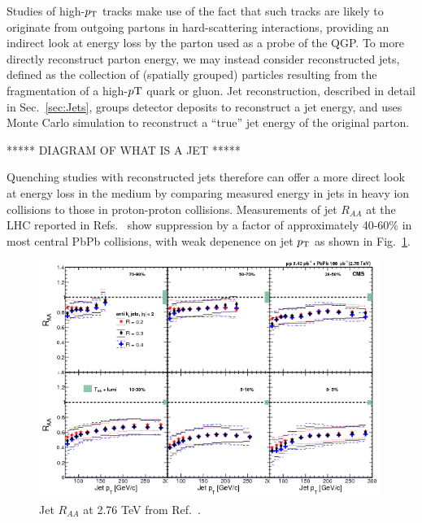Studies of high-$p_{\rm T}$ tracks make use of the fact that such tracks are likely to originate from outgoing partons in hard-scattering interactions, providing an indirect look at energy loss by the parton used as a probe of the QGP.  To more directly reconstruct parton energy, we may instead consider reconstructed jets, defined as the collection of (spatially grouped) particles resulting from the fragmentation of a high-$p{\rm T}$ quark or gluon.  Jet reconstruction, described in detail in Sec.~\ref{sec:Jets}, groups detector deposits to reconstruct a jet energy, and uses Monte Carlo simulation to reconstruct a ``true'' jet energy of the original parton. 

***** DIAGRAM OF WHAT IS A JET *****

Quenching studies with reconstructed jets therefore can offer a more direct look at energy loss in the medium by comparing measured energy in jets in heavy ion collisions to those in proton-proton collisions.  Measurements of jet $R_{AA}$ at the LHC reported in Refs.~\cite{Aad:2014bxa, Khachatryan:2016jfl} show suppression by a factor of approximately 40-60\% in most central PbPb collisions, with weak depenence on jet $p_{\rm T}$ as shown in Fig.~\ref{fig:cms_jet_raa}.  

\begin{figure}[h!]
\begin{center}
\includegraphics[width=0.99\textwidth]{figures/Theory/JetRaa_CMS.png}
\caption[Jet $R_{AA}$ at 2.76 TeV]{Jet $R_{AA}$ at 2.76 TeV from Ref.~\cite{Khachatryan:2016jfl}.}
\label{fig:cms_jet_raa}
\end{center}
\end{figure}


